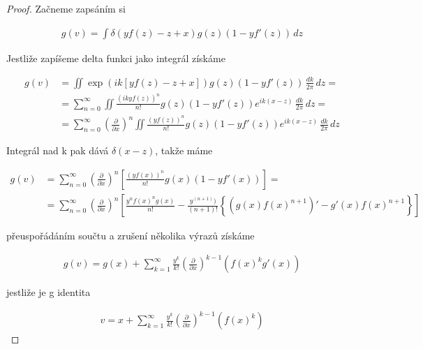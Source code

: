 \begin{proof}
      Začneme zapsáním si 
      
      \begin{align}
            g(v) = \int \delta(y f(z) - z 
            + x) g(z) (1-y f'(z)) \, dz
      \end{align}
      
            Jestliže zapíšeme delta 
            funkci jako integrál získáme
            
      \begin{align}
            g(v) & = \iint \exp(ik[y f(z) -
            z + x]) g(z) (1-y f'(z)) \, 
            \frac{dk}{2\pi} \, dz =\\[10pt]
            & =\sum_{n=0}^\infty \iint \frac{(ik
            y f(z))^n}{n!} g(z) (1-y f'(z)) e^{ik(x-
            z)}\, \frac{dk}{2\pi} \, dz =\\[10pt]
            & =\sum_{n=0}^\infty \left(\frac{\partial}{
            \partial x}\right)^n\iint \frac{(y f(z))^n}{n
            !} g(z) (1-y f'(z)) e^{ik(x-z)} \, \frac{dk}{
            2\pi} \, dz
      \end{align}
      
      Integrál nad k pak dává \(\delta(x-z)\), takže máme
      
      \begin{align}
            g(v) & = \sum_{n=0}^\infty \left(\frac{\partial}{
            \partial x}\right)^n \left[ \frac{(y f(x))^n}{n!} 
            g(x) (1-y f'(x))\right] =\\[10pt]
            & =\sum_{n=0}^\infty \left(\frac{\partial}{\partial
            x}\right)^n \left[ 
            \frac{y^n f(x)^n g(x)}{n!} -
            \frac{y^{(n+1)})}{(n+1)!}\left\{ 
            (g(x) f(x)^{n+1})' - g'(x) f(x)^{n+
            1}\right\} \right]
      \end{align}
      
      přeuspořádáním součtu a zrušení několika výrazů získáme
      
      \begin{align}
            g(v)=g(x)+\sum_{k=1}^\infty\frac{y^k}{k!}
            \left(\frac\partial{\partial x}\right)^{k-1}
            \left(f(x)^kg'(x)\right)
      \end{align}
      
      jestliže je g identita
      
      \begin{align}
            v=x+\sum_{k=1}^\infty\frac{y^k}{k!}\left(\frac\partial{
            \partial x}\right)^{k-1}\left(f(x)^k\right)
      \end{align}
 \end{proof}
 
